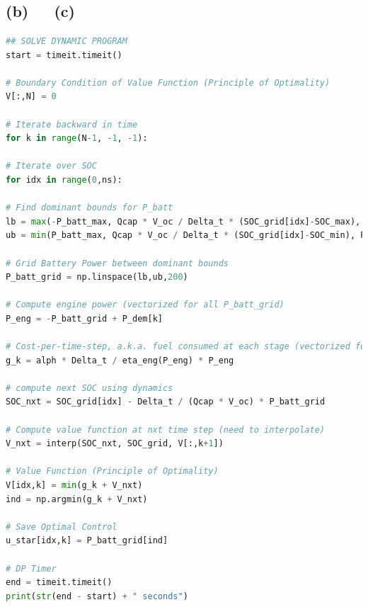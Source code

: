 \documentclass[12pt]{article}
\begin{document}
\section{}
\subsection{(b)\ \ \ (c)}
\begin{lstlisting}[language=Python]
## SOLVE DYNAMIC PROGRAM
start = timeit.timeit()

# Boundary Condition of Value Function (Principle of Optimality)
V[:,N] = 0

# Iterate backward in time
for k in range(N-1, -1, -1):

# Iterate over SOC
for idx in range(0,ns):

# Find dominant bounds for P_batt
lb = max(-P_batt_max, Qcap * V_oc / Delta_t * (SOC_grid[idx]-SOC_max), P_dem[k] - P_eng_max)
ub = min(P_batt_max, Qcap * V_oc / Delta_t * (SOC_grid[idx]-SOC_min), P_dem[k])

# Grid Battery Power between dominant bounds
P_batt_grid = np.linspace(lb,ub,200)

# Compute engine power (vectorized for all P_batt_grid)
P_eng = -P_batt_grid + P_dem[k]

# Cost-per-time-step, a.k.a. fuel consumed at each stage (vectorized for all P_batt_grid)
g_k = alph * Delta_t / eta_eng(P_eng) * P_eng

# compute next SOC using dynamics
SOC_nxt = SOC_grid[idx] - Delta_t / (Qcap * V_oc) * P_batt_grid

# Compute value function at nxt time step (need to interpolate)
V_nxt = interp(SOC_nxt, SOC_grid, V[:,k+1])

# Value Function (Principle of Optimality)
V[idx,k] = min(g_k + V_nxt)
ind = np.argmin(g_k + V_nxt)

# Save Optimal Control
u_star[idx,k] = P_batt_grid[ind]

# DP Timer
end = timeit.timeit()
print(str(end - start) + " seconds")
\end{lstlisting}
\newpage
\section{}
\end{document}
